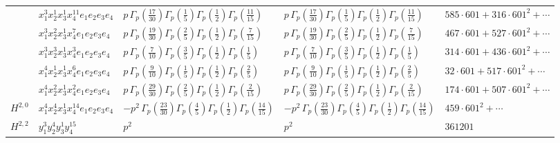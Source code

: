 \documentclass[11pt]{article}
\begin{document}
\begin{table}[ht]
{\begin{tabular}{@{}lllll@{}}
 & $x_{1}^{3} x_{2}^{1} x_{3}^{1} x_{4}^{11}  e_{1} e_{2} e_{3} e_{4}$ & $p \, \Gamma_p \left( \frac{17}{30} \right) \Gamma_p \left( \frac{1}{5} \right) \Gamma_p \left( \frac{1}{2} \right) \Gamma_p \left( \frac{11}{15} \right)$ & $p \, \Gamma_p \left( \frac{17}{30} \right) \Gamma_p \left( \frac{1}{5} \right) \Gamma_p \left( \frac{1}{2} \right) \Gamma_p \left( \frac{11}{15} \right)$ & $585{\cdot}601{+}316{\cdot}601^{2}{+}\cdots$ \\
 & $x_{1}^{3} x_{2}^{2} x_{3}^{1} x_{4}^{7}  e_{1} e_{2} e_{3} e_{4}$ & $p \, \Gamma_p \left( \frac{19}{30} \right) \Gamma_p \left( \frac{2}{5} \right) \Gamma_p \left( \frac{1}{2} \right) \Gamma_p \left( \frac{7}{15} \right)$ & $p \, \Gamma_p \left( \frac{19}{30} \right) \Gamma_p \left( \frac{2}{5} \right) \Gamma_p \left( \frac{1}{2} \right) \Gamma_p \left( \frac{7}{15} \right)$ & $467{\cdot}601{+}527{\cdot}601^{2}{+}\cdots$ \\
 & $x_{1}^{3} x_{2}^{3} x_{3}^{1} x_{4}^{3}  e_{1} e_{2} e_{3} e_{4}$ & $p \, \Gamma_p \left( \frac{7}{10} \right) \Gamma_p \left( \frac{3}{5} \right) \Gamma_p \left( \frac{1}{2} \right) \Gamma_p \left( \frac{1}{5} \right)$ & $p \, \Gamma_p \left( \frac{7}{10} \right) \Gamma_p \left( \frac{3}{5} \right) \Gamma_p \left( \frac{1}{2} \right) \Gamma_p \left( \frac{1}{5} \right)$ & $314{\cdot}601{+}436{\cdot}601^{2}{+}\cdots$ \\
 & $x_{1}^{4} x_{2}^{1} x_{3}^{1} x_{4}^{6}  e_{1} e_{2} e_{3} e_{4}$ & $p \, \Gamma_p \left( \frac{9}{10} \right) \Gamma_p \left( \frac{1}{5} \right) \Gamma_p \left( \frac{1}{2} \right) \Gamma_p \left( \frac{2}{5} \right)$ & $p \, \Gamma_p \left( \frac{9}{10} \right) \Gamma_p \left( \frac{1}{5} \right) \Gamma_p \left( \frac{1}{2} \right) \Gamma_p \left( \frac{2}{5} \right)$ & $32{\cdot}601{+}517{\cdot}601^{2}{+}\cdots$ \\
 & $x_{1}^{4} x_{2}^{2} x_{3}^{1} x_{4}^{2}  e_{1} e_{2} e_{3} e_{4}$ & $p \, \Gamma_p \left( \frac{29}{30} \right) \Gamma_p \left( \frac{2}{5} \right) \Gamma_p \left( \frac{1}{2} \right) \Gamma_p \left( \frac{2}{15} \right)$ & $p \, \Gamma_p \left( \frac{29}{30} \right) \Gamma_p \left( \frac{2}{5} \right) \Gamma_p \left( \frac{1}{2} \right) \Gamma_p \left( \frac{2}{15} \right)$ & $174{\cdot}601{+}507{\cdot}601^{2}{+}\cdots$ \\
\midrule
$H^{2,0}$ & $x_{1}^{4} x_{2}^{4} x_{3}^{1} x_{4}^{14}  e_{1} e_{2} e_{3} e_{4}$ & $- p^{2} \, \Gamma_p \left( \frac{23}{30} \right) \Gamma_p \left( \frac{4}{5} \right) \Gamma_p \left( \frac{1}{2} \right) \Gamma_p \left( \frac{14}{15} \right)$ & $- p^{2} \, \Gamma_p \left( \frac{23}{30} \right) \Gamma_p \left( \frac{4}{5} \right) \Gamma_p \left( \frac{1}{2} \right) \Gamma_p \left( \frac{14}{15} \right)$ & $459{\cdot}601^{2}{+}\cdots$ \\
\midrule
$H^{2,2}$ & $y_{1}^{3} y_{2}^{4} y_{3}^{1} y_{4}^{15}$ & $p^{2} \,$ & $p^{2} \,$ & $361201$ \\
\bottomrule
\end{tabular}
}
\renewcommand{\arraystretch}{1.0}
\end{table}
\end{document}
